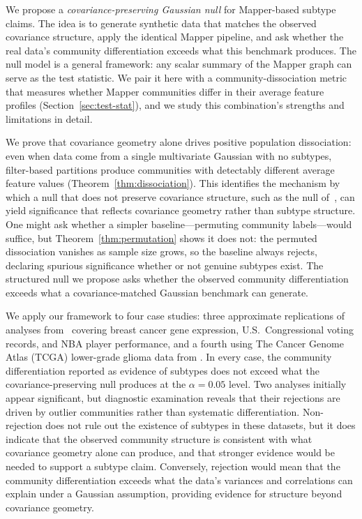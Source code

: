 \documentclass[hidelinks]{siamart251216}
\begin{document}
We propose a \emph{covariance-preserving Gaussian null} for
Mapper-based subtype claims.  The idea is to generate synthetic data
that matches the observed covariance structure, apply the identical
Mapper pipeline, and ask whether the real data's community
differentiation exceeds what this benchmark produces.  The null model is
a general framework: any scalar summary of the Mapper graph can serve as
the test statistic.  We pair it here with a community-dissociation
metric that measures whether Mapper communities differ in their average
feature profiles (Section~\ref{sec:test-stat}), and we study this
combination's strengths and limitations in detail.

We prove that covariance geometry alone
drives positive population dissociation: even when data come from a
single multivariate Gaussian with no subtypes, filter-based partitions
produce communities with detectably different average feature values
(Theorem~\ref{thm:dissociation}).  This identifies the mechanism by which a null that does not preserve
covariance structure, such as the null of~\cite{Lum2013}, can yield
significance that reflects covariance geometry rather than subtype
structure.  One might ask
whether a simpler baseline---permuting community labels---would
suffice, but Theorem~\ref{thm:permutation} shows it does not: the permuted dissociation vanishes as sample size grows, so
the baseline always rejects, declaring spurious significance whether or not genuine subtypes exist.  The
structured null we propose asks
whether the observed community differentiation exceeds what a
covariance-matched Gaussian benchmark can generate.

We apply our framework to four case studies: three approximate
replications of analyses from~\cite{Lum2013} covering breast cancer gene
expression, U.S.\ Congressional voting records, and NBA player
performance, and a fourth using The Cancer Genome Atlas (TCGA) lower-grade glioma data from
\cite{RabadanCamara2020}.  In every case, the community differentiation
reported as evidence of subtypes does not exceed what the
covariance-preserving null produces at the $\alpha = 0.05$ level.  Two
analyses initially appear significant, but diagnostic examination
reveals that their rejections are driven by outlier communities rather
than systematic differentiation.  Non-rejection does not rule out the
existence of subtypes in these datasets, but it does indicate that the
observed community structure is consistent with what covariance geometry
alone can produce, and that stronger evidence would be needed to support
a subtype claim.  Conversely, rejection would mean that the community
differentiation exceeds what the data's variances and correlations can
explain under a Gaussian assumption, providing evidence for structure
beyond covariance geometry.
\end{document}
